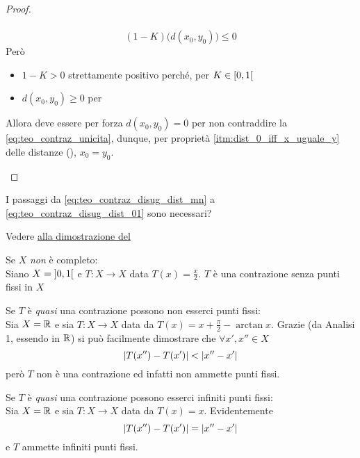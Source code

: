 \begin{theorem}
\begin{proof}
\begin{enumerate}
\begin{equation*}
\begin{gathered}
					\end{gathered}
				\end{equation*}
				\begin{equation}
					\label{eq:teo_contraz_unicita}
					(1-K) \bigl( d(x_0, y_0) \bigr) \leq 0
				\end{equation}
				Però
				\begin{itemize}
					\item $1-K > 0$ strettamente positivo perché, per  $K \in \left[0,1\right[$
					\item $d(x_0, y_0) \geq 0$ per 
				\end{itemize}
				Allora deve essere per forza $d(x_0, y_0) = 0$ per non contraddire la \cref{eq:teo_contraz_unicita}, dunque, per proprietà \ref{itm:dist_0_iff_x_uguale_y} delle distanze (), $x_0 = y_0$.
		\end{enumerate}
	\end{proof}
\end{theorem}
\begin{exercise}
	I passaggi da \cref{eq:teo_contraz_disug_dist_mn} a \cref{eq:teo_contraz_disug_dist_01} sono necessari?
	\begin{solution}
		Vedere \hyperlink{note:teo_contraz_note}{\notestyle{} alla dimostrazione del }
	\end{solution}
\end{exercise}
\begin{example}
	Se $X$ \textit{non} è completo:\\
	Siano $X = \left]0,1\right[$ e $T: X \to X$ data $T(x) = \frac{x}{2}$. $T$ è una contrazione senza punti fissi in $X$
\end{example}
\begin{example}
	Se $T$ è \textit{quasi} una contrazione possono non esserci punti fissi:\\
	Sia $X = \mathbb{R}$ e sia $T:X \to X$ data da $T(x) = x + \frac{\pi}{2} - \arctan x$. Grazie  (da Analisi 1, essendo in $\mathbb{R}$) si può facilmente dimostrare che $\forall x', x'' \in X$
	\[\left|T(x'') - T(x')\right| < \left|x'' - x'\right|\]
	però $T$ non è una contrazione ed infatti non ammette punti fissi.
\end{example}
\begin{example}
	Se $T$ è \textit{quasi} una contrazione possono esserci infiniti punti fissi:\\
	Sia $X = \mathbb{R}$ e sia $T:X \to X$ data da $T(x) = x$. Evidentemente
	\[\left|T(x'') - T(x')\right| = \left|x'' - x'\right|\]
	e $T$ ammette infiniti punti fissi.
\end{example}
